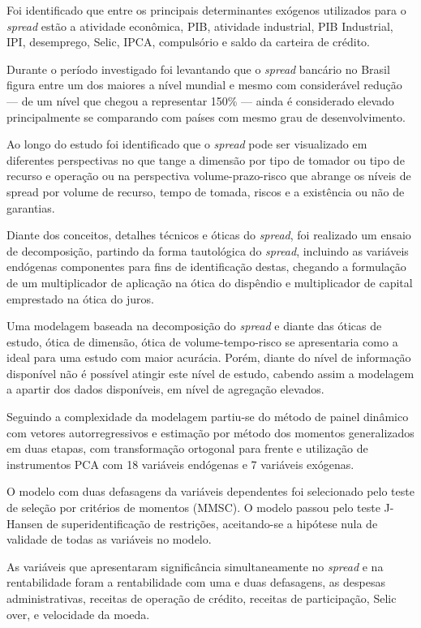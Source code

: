 \documentclass[
  12pt,
  12pt,
  openright,
  oneside,
  a4paper,
  chapter=TITLE,
  section=TITLE,
  subsection=TITLE,
  subsubsection=TITLE,
  portugues,
  sumario=tradicional]{abntex2}
\begin{document}
Foi identificado que entre os principais determinantes exógenos utilizados para o \emph{spread} estão a atividade econômica, PIB, atividade industrial, PIB Industrial, IPI, desemprego, Selic, IPCA, compulsório e saldo da carteira de crédito.

Durante o período investigado foi levantando que o \emph{spread} bancário no Brasil figura entre um dos maiores a nível mundial e mesmo com considerável redução --- de um nível que chegou a representar 150\% --- ainda é considerado elevado principalmente se comparando com países com mesmo grau de desenvolvimento.

Ao longo do estudo foi identificado que o \emph{spread} pode ser visualizado em diferentes perspectivas no que tange a dimensão por tipo de tomador ou tipo de recurso e operação ou na perspectiva volume-prazo-risco que abrange os níveis de spread por volume de recurso, tempo de tomada, riscos e a existência ou não de garantias.

Diante dos conceitos, detalhes técnicos e óticas do \emph{spread}, foi realizado um ensaio de decomposição, partindo da forma tautológica do \emph{spread}, incluindo as variáveis endógenas componentes para fins de identificação destas, chegando a formulação de um multiplicador de aplicação na ótica do dispêndio e multiplicador de capital emprestado na ótica do juros.

Uma modelagem baseada na decomposição do \emph{spread} e diante das óticas de estudo, ótica de dimensão, ótica de volume-tempo-risco se apresentaria como a ideal para uma estudo com maior acurácia. Porém, diante do nível de informação disponível não é possível atingir este nível de estudo, cabendo assim a modelagem a apartir dos dados disponíveis, em nível de agregação elevados.

Seguindo a complexidade da modelagem partiu-se do método de painel dinâmico com vetores autorregressivos e estimação por método dos momentos generalizados em duas etapas, com transformação ortogonal para frente e utilização de instrumentos PCA com 18 variáveis endógenas e 7 variáveis exógenas.

O modelo com duas defasagens da variáveis dependentes foi selecionado pelo teste de seleção por critérios de momentos (MMSC). O modelo passou pelo teste J-Hansen de superidentificação de restrições, aceitando-se a hipótese nula de validade de todas as variáveis no modelo.

As variáveis que apresentaram significância simultaneamente no \emph{spread} e na rentabilidade foram a rentabilidade com uma e duas defasagens, as despesas administrativas, receitas de operação de crédito, receitas de participação, Selic over, e velocidade da moeda.
\end{document}
